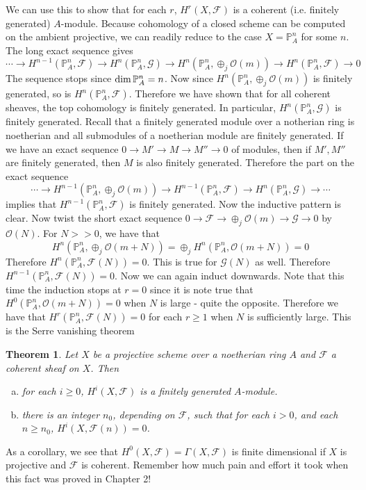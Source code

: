 \documentclass[12pt]{article}
\theoremstyle{plain}
\newtheorem{theorem}[equation]{Theorem}
\theoremstyle{definition}
\newcommand{\IP}{\mathbb{P}}
\newcommand{\sO}{\mathcal{O}}
\newcommand{\shF}{\mathscr{F}}
\newcommand{\shG}{\mathscr{G}}
\renewcommand\dim{{\rm dim\,}}
\newcommand{\<}{\langle}
\renewcommand{\>}{\rangle}
\begin{document}
We can use this to show that for each $r$, $H^r(X, \shF)$ is a coherent (i.e. finitely generated) $A$-module. Because cohomology of a closed scheme can be computed on the ambient projective, we can readily reduce to the case $X = \IP_A^n$ for some $n$. 
The long exact sequence gives 
$$ \cdots \to H^{n - 1}(\IP_A^n, \shF) \to H^n(\IP_A^n, \shG) \to H^n(\IP_A^n, \oplus_j \sO(m)) \to H^n(\IP_A^n, \shF) \to 0 $$
The sequence stops since $\dim \IP^n_A = n$. Now since $H^n(\IP_A^n, \oplus_j \sO(m))$ is finitely generated, so is $H^n(\IP_A^n, \shF)$. Therefore we have shown that for all coherent sheaves, the top cohomology is finitely generated. In particular, $H^n(\IP_A^n, \shG)$ is finitely generated. Recall that a finitely generated module over a notherian ring is noetherian and all submodules of a noetherian module are finitely generated. If we have an exact sequence $0 \to M' \to M \to M'' \to 0$ of modules, then if $M', M''$ are finitely generated, then $M$ is also finitely generated. Therefore the part on the exact sequence 
$$ \cdots \to H^{n - 1}(\IP_A^n, \oplus_j \sO(m)) \to H^{n - 1}(\IP_A^n, \shF) \to H^n(\IP_A^n, \shG) \to \cdots $$
implies that $H^{n - 1}(\IP_A^n, \shF)$ is finitely generated. Now the inductive pattern is clear. Now twist the short exact sequence $0 \to \shF \to \oplus_j \sO(m) \to \shG \to 0$ by $\sO(N)$. For $N > > 0$, we have that 
$$ H^n(\IP_A^n, \oplus_j \sO(m + N)) = \oplus_j H^n(\IP_A^n,\sO(m + N)) = 0$$
Therefore $H^n(\IP_A^n, \shF(N)) = 0$. This is true for $\shG(N)$ as well. Therefore $H^{n - 1}(\IP_A^n, \shF(N)) = 0$. Now we can again induct downwards. Note that this time the induction stops at $r = 0$ since it is note true that $H^0(\IP_A^n, \sO(m + N)) = 0$ when $N$ is large - quite the opposite. Therefore we have that $H^r(\IP_A^n, \shF(N)) = 0$ for each $r \ge 1$ when $N$ is sufficiently large. This is the Serre vanishing theorem
\begin{theorem}
Let $X$ be a projective scheme over a noetherian ring $A$ and $\shF$ a coherent sheaf on $X$. Then 
\begin{enumerate}[a.]
\item for each $i \ge 0$, $H^i(X, \shF)$ is a finitely generated $A$-module. 
\item there is an integer $n_0$, depending on $\shF$, such that for each $i > 0$, and each $n \ge n_0$, $H^i(X, \shF(n)) = 0$. 
\end{enumerate}
\end{theorem}  

As a corollary, we see that $H^0(X, \shF) = \Gamma(X, \shF)$ is finite dimensional if $X$ is projective and $\shF$ is coherent. Remember how much pain and effort it took when this fact was proved in Chapter 2!
\end{document}
